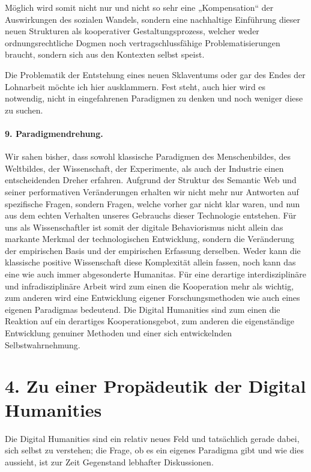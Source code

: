 \documentclass[a4paper,11pt]{article}
\begin{document}
Möglich wird somit nicht nur und nicht so sehr eine „Kompensation“ der
Auswirkungen des sozialen Wandels, sondern eine nachhaltige Einführung dieser
neuen Strukturen als kooperativer Gestaltungsprozess, welcher weder
ordnungsrechtliche Dogmen noch vertragschlussfähige Problematisierungen
braucht, sondern sich aus den Kontexten selbst speist.

Die Problematik der Entstehung eines neuen Sklaventums oder gar des Endes der
Lohnarbeit möchte ich hier ausklammern. Fest steht, auch hier wird es
notwendig, nicht in eingefahrenen Paradigmen zu denken und noch weniger diese
zu suchen.
\enlargethispage{1em}

\paragraph{9. Paradigmendrehung.}

Wir sahen bisher, dass sowohl klassische Paradigmen des Menschenbildes, des
Weltbildes, der Wissenschaft, der Experimente, als auch der Industrie einen
entscheidenden Dreher erfahren. Aufgrund der Struktur des Semantic Web und
seiner performativen Veränderungen erhalten wir nicht mehr nur Antworten auf
spezifische Fragen, sondern Fragen, welche vorher gar nicht klar waren, und
nun aus dem echten Verhalten unseres Gebrauchs dieser Technologie
entstehen. Für uns als Wissenschaftler ist somit der digitale Behaviorismus
nicht allein das markante Merkmal der technologischen Entwicklung, sondern die
Veränderung der empirischen Basis und der empirischen Erfassung
derselben. Weder kann die klassische positive Wissenschaft diese Komplexität
allein fassen, noch kann das eine wie auch immer abgesonderte Humanitas. Für
eine derartige interdisziplinäre und infradisziplinäre Arbeit wird zum einen
die Kooperation mehr als wichtig, zum anderen wird eine Entwicklung eigener
Forschungsmethoden wie auch eines eigenen Paradigmas bedeutend. Die Digital
Humanities sind zum einen die Reaktion auf ein derartiges Kooperationsgebot,
zum anderen die eigenständige Entwicklung genuiner Methoden und einer sich
entwickelnden Selbstwahrnehmung.

\section*{4. Zu einer Propädeutik der Digital Humanities}

Die Digital Humanities sind ein relativ neues Feld und tatsächlich gerade
dabei, sich selbst zu verstehen; die Frage, ob es ein eigenes Paradigma gibt
und wie dies aussieht, ist zur Zeit Gegenstand lebhafter Diskussionen.
\end{document}
